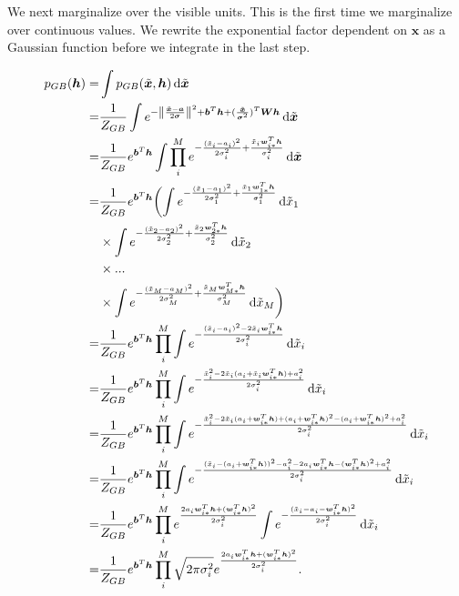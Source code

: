 \documentclass[twoside,english]{uiofysmaster}
\newcommand*\dif{\mathop{}\!\mathrm{d}}
\DeclarePairedDelimiter{\norm}{\lVert}{\rVert}
\begin{document}
We next marginalize over the visible units. This is the first time we marginalize over continuous values. We rewrite the exponential factor dependent on $\bm{x}$ as a Gaussian function before we integrate in the last step.

\begin{align}
	p_{GB} (\bm{h}) =& \int p_{GB} (\tilde{\bm{x}}, \bm{h}) \dif \tilde{\bm{x}} \nonumber \\
	=& \frac{1}{Z_{GB}} \int e^{-\norm*{\frac{\tilde{\bm{x}} -\bm{a}}{2\bm{\sigma}}}^2 + \bm{b}^T \bm{h} 
	+ (\frac{\tilde{\bm{x}}}{\bm{\sigma}^2})^T \bm{W}\bm{h}} \dif \tilde{\bm{x}} \nonumber \\
	=& \frac{1}{Z_{GB}} e^{\bm{b}^T \bm{h} } \int \prod_i^M
	e^{- \frac{(\tilde{x}_i - a_i)^2}{2\sigma_i^2} + \frac{\tilde{x}_i \bm{w}_{i\ast}^T \bm{h}}{\sigma_i^2} } \dif \tilde{\bm{x}} \nonumber \\
	=& \frac{1}{Z_{GB}} e^{\bm{b}^T \bm{h} }
	\biggl( \int e^{- \frac{(\tilde{x}_1 - a_1)^2}{2\sigma_1^2} + \frac{\tilde{x}_1 \bm{w}_{1\ast}^T \bm{h}}{\sigma_1^2} } \dif \tilde{x}_1 \nonumber \\
	& \times \int e^{- \frac{(\tilde{x}_2 - a_2)^2}{2\sigma_2^2} + \frac{\tilde{x}_2 \bm{w}_{2\ast}^T \bm{h}}{\sigma_2^2} } \dif \tilde{x}_2 \nonumber \\
	& \times ... \nonumber \\
	&\times \int e^{- \frac{(\tilde{x}_M - a_M)^2}{2\sigma_M^2} + \frac{\tilde{x}_M \bm{w}_{M\ast}^T \bm{h}}{\sigma_M^2} } \dif \tilde{x}_M \biggr) \nonumber \\
	=& \frac{1}{Z_{GB}} e^{\bm{b}^T \bm{h}} \prod_i^M
	\int e^{- \frac{(\tilde{x}_i - a_i)^2 - 2\tilde{x}_i \bm{w}_{i\ast}^T \bm{h}}{2\sigma_i^2} } \dif \tilde{x}_i \nonumber \\
	=& \frac{1}{Z_{GB}} e^{\bm{b}^T \bm{h}} \prod_i^M
	\int e^{- \frac{\tilde{x}_i^2 - 2\tilde{x}_i(a_i + \tilde{x}_i \bm{w}_{i\ast}^T \bm{h}) + a_i^2}{2\sigma_i^2} } \dif \tilde{x}_i \nonumber \\
	=& \frac{1}{Z_{GB}} e^{\bm{b}^T \bm{h}} \prod_i^M
	\int e^{- \frac{\tilde{x}_i^2 - 2\tilde{x}_i(a_i + \bm{w}_{i\ast}^T \bm{h}) + (a_i + \bm{w}_{i\ast}^T \bm{h})^2 - (a_i + \bm{w}_{i\ast}^T \bm{h})^2 + a_i^2}{2\sigma_i^2} } \dif \tilde{x}_i \nonumber \\
	=& \frac{1}{Z_{GB}} e^{\bm{b}^T \bm{h}} \prod_i^M
	\int e^{- \frac{(\tilde{x}_i - (a_i + \bm{w}_{i\ast}^T \bm{h}))^2 - a_i^2 -2a_i \bm{w}_{i\ast}^T \bm{h} - (\bm{w}_{i\ast}^T \bm{h})^2 + a_i^2}{2\sigma_i^2} } \dif \tilde{x}_i \nonumber \\
	=& \frac{1}{Z_{GB}} e^{\bm{b}^T \bm{h}} \prod_i^M
	e^{\frac{2a_i \bm{w}_{i\ast}^T \bm{h} +(\bm{w}_{i\ast}^T \bm{h})^2 }{2\sigma_i^2}}
	\int e^{- \frac{(\tilde{x}_i - a_i - \bm{w}_{i\ast}^T \bm{h})^2}{2\sigma_i^2}}
	\dif \tilde{x}_i \nonumber \\
	=& \frac{1}{Z_{GB}} e^{\bm{b}^T \bm{h}} \prod_i^M
	\sqrt{2\pi \sigma_i^2}
	e^{\frac{2a_i \bm{w}_{i\ast}^T \bm{h} +(\bm{w}_{i\ast}^T \bm{h})^2 }{2\sigma_i^2}} .
\end{align}
\end{document}
